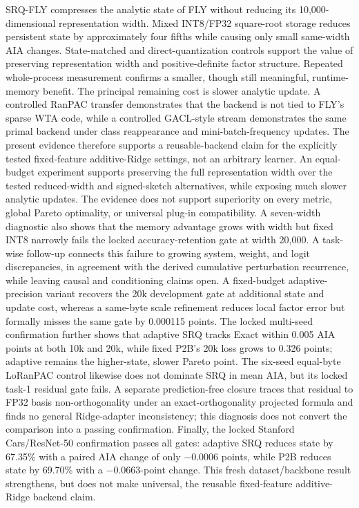 \documentclass[runningheads]{llncs}
\begin{document}
SRQ-FLY compresses the analytic state of FLY without reducing its
10,000-dimensional representation width. Mixed INT8/FP32 square-root storage
reduces persistent state by approximately four fifths while causing only small
same-width AIA changes. State-matched and direct-quantization controls support
the value of preserving representation width and positive-definite factor
structure. Repeated whole-process measurement confirms a smaller, though still
meaningful, runtime-memory benefit. The principal remaining cost is slower
analytic update. A controlled RanPAC transfer demonstrates that the backend
is not tied to FLY's sparse WTA code, while a controlled GACL-style stream
demonstrates the same primal backend under class reappearance and
mini-batch-frequency updates. The present evidence therefore supports a
reusable-backend claim for the explicitly tested fixed-feature additive-Ridge
settings, not an arbitrary learner. An equal-budget experiment supports preserving
the full representation width over the tested reduced-width and signed-sketch
alternatives, while exposing much slower analytic updates. The evidence does
not support superiority on every metric, global Pareto optimality, or
universal plug-in compatibility. A seven-width diagnostic also shows that the
memory advantage grows with width but fixed INT8 narrowly fails the locked
accuracy-retention gate at width 20,000. A task-wise follow-up connects this
failure to growing system, weight, and logit discrepancies, in agreement with
the derived cumulative perturbation recurrence, while leaving causal and
conditioning claims open. A fixed-budget adaptive-precision variant recovers
the 20k development gate at additional state and update cost, whereas a
same-byte scale refinement reduces local factor error but formally misses the
same gate by 0.000115 points. The locked multi-seed confirmation further shows
that adaptive SRQ tracks Exact within 0.005 AIA points at both 10k and 20k,
while fixed P2B's 20k loss grows to 0.326 points; adaptive remains the
higher-state, slower Pareto point.
The six-seed equal-byte LoRanPAC control likewise does not dominate SRQ in
mean AIA, but its locked task-1 residual gate fails. A separate
prediction-free closure traces that residual to FP32 basis non-orthogonality
under an exact-orthogonality projected formula and finds no general
Ridge-adapter inconsistency; this diagnosis does not convert the comparison
into a passing confirmation.
Finally, the locked Stanford Cars/ResNet-50 confirmation passes all gates:
adaptive SRQ reduces state by 67.35\% with a paired AIA change of only
$-0.0006$ points, while P2B reduces state by 69.70\% with a $-0.0663$-point
change. This fresh dataset/backbone result strengthens, but does not make
universal, the reusable fixed-feature additive-Ridge backend claim.
\end{document}
